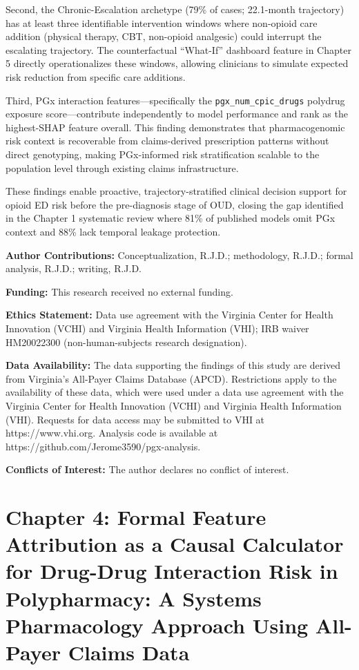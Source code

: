 \documentclass[
  12pt,
]{book}
\begin{document}
Second, the Chronic-Escalation archetype (79\% of cases; 22.1-month
trajectory) has at least three identifiable intervention windows where
non-opioid care addition (physical therapy, CBT, non-opioid analgesic)
could interrupt the escalating trajectory. The counterfactual
``What-If'' dashboard feature in Chapter 5 directly operationalizes
these windows, allowing clinicians to simulate expected risk reduction
from specific care additions.

Third, PGx interaction features---specifically the
\texttt{pgx\_num\_cpic\_drugs} polydrug exposure score---contribute
independently to model performance and rank as the highest-SHAP feature
overall. This finding demonstrates that pharmacogenomic risk context is
recoverable from claims-derived prescription patterns without direct
genotyping, making PGx-informed risk stratification scalable to the
population level through existing claims infrastructure.

These findings enable proactive, trajectory-stratified clinical decision
support for opioid ED risk before the pre-diagnosis stage of OUD,
closing the gap identified in the Chapter 1 systematic review where 81\%
of published models omit PGx context and 88\% lack temporal leakage
protection.

\textbf{Author Contributions:} Conceptualization, R.J.D.; methodology,
R.J.D.; formal analysis, R.J.D.; writing, R.J.D.

\textbf{Funding:} This research received no external funding.

\textbf{Ethics Statement:} Data use agreement with the Virginia Center
for Health Innovation (VCHI) and Virginia Health Information (VHI); IRB
waiver HM20022300 (non-human-subjects research designation).

\textbf{Data Availability:} The data supporting the findings of this
study are derived from Virginia's All-Payer Claims Database (APCD).
Restrictions apply to the availability of these data, which were used
under a data use agreement with the Virginia Center for Health
Innovation (VCHI) and Virginia Health Information (VHI). Requests for
data access may be submitted to VHI at https://www.vhi.org. Analysis
code is available at https://github.com/Jerome3590/pgx-analysis.

\textbf{Conflicts of Interest:} The author declares no conflict of
interest.

\cleardoublepage

\chapter{Chapter 4: Formal Feature Attribution as a Causal Calculator
for Drug-Drug Interaction Risk in Polypharmacy: A Systems Pharmacology
Approach Using All-Payer Claims Data}\label{chap-4}
\end{document}
